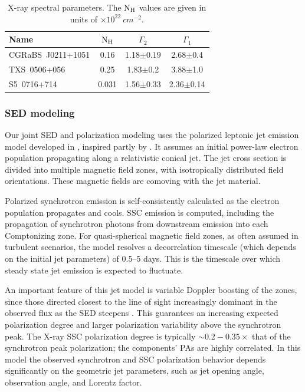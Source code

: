 \begin{table}[t]
\caption{X-ray spectral parameters. The $\rm \rm N_H$ values are given in units of $\times10^{22}~cm^{-2}$.}
\centering
\begin{tabular}{lccc}
    \toprule
     Name &  $\rm N_H$ &  $\Gamma_2$  &  $\Gamma_1$ \\
    \midrule
    CGRaBS~J0211+1051 & 0.16 & 1.18$\pm0.19$  & 2.68$\pm$0.4 \\
    TXS~0506+056 & 0.25 & 1.83$\pm$0.2 & 3.88$\pm$1.0 \\
    S5~0716+714 & 0.031 & 1.56$\pm0.33$ & 2.36$\pm$0.14 \\
    \bottomrule
\end{tabular}
\label{tab:xspec}
\end{table}

\subsubsection{SED modeling}
Our joint SED and polarization modeling uses the polarized leptonic jet emission model developed in \citet{peirson_polarization_2018,peirson_polarization_2019}, inspired partly by \citet{potter_synchrotron_2012, marscher_turbulent_2014}. It assumes an initial power-law electron population propagating along a relativistic conical jet. The jet cross section is divided into multiple magnetic field zones, with isotropically distributed field orientations. These magnetic fields are comoving with the jet material.

Polarized synchrotron emission is self-consistently calculated as the electron population propagates and cools. SSC emission is computed, including the propagation of synchrotron photons from downstream emission into each Comptonizing zone. For quasi-spherical magnetic field zones, as often assumed in turbulent scenarios, the model resolves a decorrelation timescale (which depends on the initial jet parameters) of 0.5--5 days. This is the timescale over which steady state jet emission is expected to fluctuate.

An important feature of this jet model is variable Doppler boosting of the zones, since those directed closest to the line of sight increasingly dominant in the observed flux as the SED steepens \citep{peirson_polarization_2019}. This guarantees an increasing expected polarization degree and larger polarization variability above the synchrotron peak. The X-ray SSC polarization degree is typically $\sim 0.2-0.35\times$ that of the synchrotron peak polarization; the components' PAs are highly correlated. In this model the observed synchrotron and SSC polarization behavior depends significantly on the geometric jet parameters, such as jet opening angle, observation angle, and Lorentz factor.

